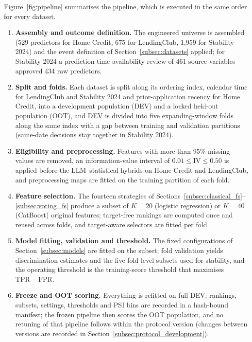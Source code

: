 \documentclass[final,5p,twocolumn]{elsarticle}
\newcommand{\Kfeat}{K}
\newcommand{\TPR}{\mathrm{TPR}}
\newcommand{\FPR}{\mathrm{FPR}}
\begin{document}
Figure~\ref{fig:pipeline} summarises the pipeline, which is executed in the same order for every dataset.
\begin{enumerate}
    \item \textbf{Assembly and outcome definition.} The engineered universe is assembled (529 predictors for Home Credit, 675 for LendingClub, 1,959 for Stability 2024) and the event definition of Section~\ref{subsec:datasets} applied; for Stability 2024 a prediction-time availability review of 461 source variables approved 434 raw predictors.
    \item \textbf{Split and folds.} Each dataset is split along its ordering index, calendar time for LendingClub and Stability 2024 and prior-application recency for Home Credit, into a development population (DEV) and a locked held-out population (OOT), and DEV is divided into five expanding-window folds along the same index with a gap between training and validation partitions (same-date decisions stay together in Stability 2024).
    \item \textbf{Eligibility and preprocessing.} Features with more than 95\% missing values are removed, an information-value interval of $0.01\le\mathrm{IV}\le0.50$ is applied before the LLM--statistical hybrids on Home Credit and LendingClub, and preprocessing maps are fitted on the training partition of each fold.
    \item \textbf{Feature selection.} The fourteen strategies of Sections~\ref{subsec:classical_fs}--\ref{subsec:voting_fs} produce a subset of $\Kfeat=20$ (logistic regression) or $\Kfeat=40$ (CatBoost) original features; target-free rankings are computed once and reused across folds, and target-aware selectors are fitted per fold.
    \item \textbf{Model fitting, validation and threshold.} The fixed configurations of Section~\ref{subsec:models} are fitted on the subset; fold validation yields discrimination estimates and the five fold-level subsets used for stability, and the operating threshold is the training-score threshold that maximises $\TPR-\FPR$.
    \item \textbf{Freeze and OOT scoring.} Everything is refitted on full DEV; rankings, subsets, settings, thresholds and PSI bins are recorded in a hash-bound manifest; the frozen pipeline then scores the OOT population, and no retuning of that pipeline follows within the protocol version (changes between versions are recorded in Section~\ref{subsec:protocol_development}).
\end{enumerate}
\end{document}
